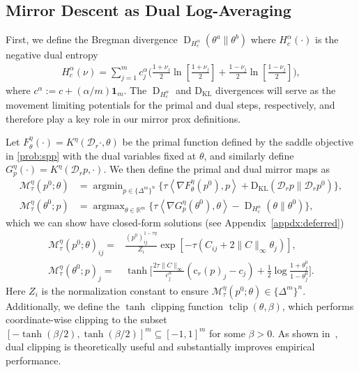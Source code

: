\documentclass[10pt]{article}
\newcommand{\R}{\mathbb{R}}
\newcommand{\DHa}{\D_{H_c^\alpha}}
\DeclareMathOperator*{\argmax}{argmax}
\DeclareMathOperator*{\argmin}{argmin}
\newcommand{\inner}[2]{\left\langle #1,#2\right\rangle}
\newcommand{\D}{\operatorname{D}}
\newcommand{\diag}[1]{\mathcal{D}_{#1}}
\theoremstyle{plain}
\theoremstyle{definition}
\theoremstyle{remark}
\newcommand{\KL}{\mathrm{D}_\mathrm{KL}}
\newcommand{\one}{\mathbf{1}}
\newcommand{\col}{\bm{\mathrm{c}}}
\begin{document}
\subsection{Mirror Descent as Dual Log-Averaging}\label{sec:mirror_maps}


First, we define the Bregman divergence $\D_{H_c^\alpha}(\theta^{a}\|\theta^{b})$ where $H_c^\alpha(\cdot)$ is the negative dual entropy
\begin{align*}
    H_c^\alpha(\nu)=\sum_{j=1}^mc^\alpha_j\biggl(\frac{1+\nu_{j}}{2}\ln\left[\frac{1+\nu_j}{2}\right]+\frac{1-\nu_{j}}{2}\ln\left[\frac{1-\nu_j}{2}\right]\biggr),
\end{align*}
where $c^\alpha:=c+(\alpha/m)\one_m$.
The $\DHa$ and $\KL$ divergences will serve as the movement limiting potentials for the primal and dual steps, respectively, and therefore play a key role in our mirror prox definitions. 


Let $F_{\theta}^{\eta }(\cdot)=K^{\eta }(\diag{r}\cdot,\theta)$ be the primal function defined by the saddle objective in \eqref{prob:spp} with the dual variables fixed at $\theta$, and similarly define $G_{p}^{\eta }(\cdot)=K^{\eta }(\diag{r}p,\cdot)$. We then define the primal and dual mirror maps as
\begin{equation}\label{def:mirror_maps}
\begin{split}
    \mathcal{M}_{\tau}^{\eta }(p^0;\theta)&=\argmin_{p\in\{\Delta^m\}^n}\{\tau\inner{\nabla F_\theta^{\eta }(p^0)}{p}+\KL(\diag{r}p\|\diag{r}p^0)\}, \\
   \mathcal{M}_{\tau}^{\eta }(\theta^0;p)&=\argmax_{\theta\in\R^m}\{\tau\inner{\nabla G_{p}^{\eta }(\theta^0)}{\theta}-\D_{H_c^\alpha}(\theta\|\theta^0)\},
   \end{split}
\end{equation}
which we can show have closed-form solutions (see Appendix~\ref{appdx:deferred})
\begin{align}
    \nonumber\mathcal{M}_{\tau}^{\eta }(p^0;\theta)_{ij}=&\frac{(p^0)^{1-\tau\eta }_{ij}}{Z_i}\exp[-\tau(C_{ij}+2\|C\|_{\infty}\theta_j)], \nonumber \\
    \mathcal{M}_{\tau}^{\eta }(\theta^0;p)_j=&\tanh\biggl[\frac{2\tau\|C\|_\infty}{c^\alpha_j}(\col_r(p)_j-c_j)+\frac{1}{2}\log\frac{1+\theta^0_j}{1-\theta^0_j}\biggr]. 
    \label{def:closed_form_opt}
    \end{align}
    Here $Z_i$ is the normalization constant to ensure $\mathcal{M}_\tau^{\eta }(p^0;\theta)\in\{\Delta^{m}\}^n$.
    Additionally, we define the $\tanh$ clipping function $\operatorname{tclip}(\theta, \beta)$, which performs coordinate-wise clipping to the subset $[-\tanh(\beta/2), \tanh(\beta/2)]^m\subseteq[-1,1]^m$ for some $\beta > 0$. As shown in~\cite{liFastComputationOptimal2025}, dual clipping is theoretically useful and substantially improves empirical performance. 
    
\end{document}
